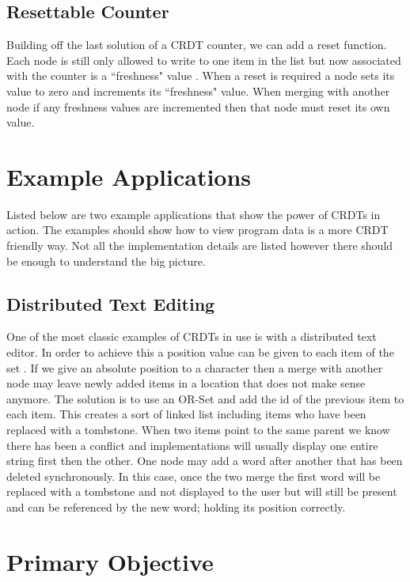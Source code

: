 \documentclass{article}
\begin{document}
\begin{multicols}{2}
\begin{refsection}
\subsection*{Resettable Counter}

Building off the last solution of a CRDT counter, we can add a reset function. Each node is still only allowed to write to one item in the list but now associated with the counter is a ``freshness" value \cite{baquero_problem_2016}. When a reset is required a node sets its value to zero and increments its ``freshness" value. When merging with another node if any freshness values are incremented then that node must reset its own value. 


\section*{Example Applications}

Listed below are two example applications that show the power of CRDTs in action. The examples should show how to view program data is a more CRDT friendly way. Not all the implementation details are listed however there should be enough to understand the big picture.

\subsection*{Distributed Text Editing}

One of the most classic examples of CRDTs in use is with a distributed text editor. In order to achieve this a position value can be given to each item of the set \cite{kleppmann_conflict-free_2017}. If we give an absolute position to a character then a merge with another node may leave newly added items in a location that does not make sense anymore. The solution is to use an OR-Set and add the id of the previous item to each item. This creates a sort of linked list including items who have been replaced with a tombstone. When two items point to the same parent we know there has been a conflict and implementations will usually display one entire string first then the other. One node may add a word after another that has been deleted synchronously. In this case, once the two merge the first word will be replaced with a tombstone and not displayed to the user but will still be present and can be referenced by the new word; holding its position correctly.

\section*{Primary Objective}


\end{refsection}
\end{multicols}
\end{document}
